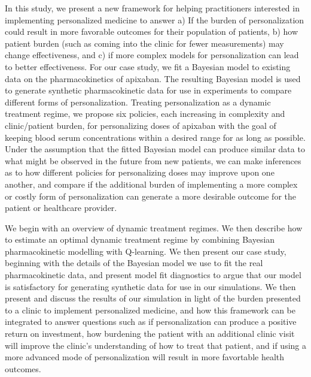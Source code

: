  In this study, we present a new framework for helping practitioners interested in implementing personalized medicine to answer a) If the burden of personalization could result in more favorable outcomes for their population of patients, b) how patient burden (such as coming into the clinic for fewer measurements) may change effectiveness, and c) if more complex models for personalization can lead to better effectiveness. For our case study, we fit a Bayesian model to existing data on the pharmacokinetics of apixaban.  The resulting Bayesian model is used to generate synthetic pharmacokinetic data for use in experiments to compare different forms of personalization. Treating personalization as a dynamic treatment regime, we propose six policies, each increasing in complexity and clinic/patient burden, for personalizing doses of apixaban with the goal of keeping blood serum concentrations within a desired range for as long as possible. Under the assumption that the fitted Bayesian model can produce similar data to what might be observed in the future from new patients, we can make inferences as to how different policies for personalizing doses may improve upon one another, and compare if the additional burden of implementing a more complex or costly form of personalization can generate a more desirable outcome for the patient or healthcare provider.  

We begin with an overview of dynamic treatment regimes.  We then describe how to estimate an optimal dynamic treatment regime  by combining Bayesian pharmacokinetic modelling with Q-learning.  We then present our case study, beginning with the details of the Bayesian model we use to fit the real pharmacokinetic data, and present model fit diagnostics to argue that our model is satisfactory for generating synthetic data for use in our simulations. We then present and discuss the results of our simulation in light of the burden presented to a clinic to implement personalized medicine, and how this framework can be integrated to answer questions such as if personalization can produce a positive return on investment, how burdening the patient with an additional clinic visit will improve the clinic's understanding of how to treat that patient, and if using a more advanced mode of personalization will result in more favortable health outcomes.
